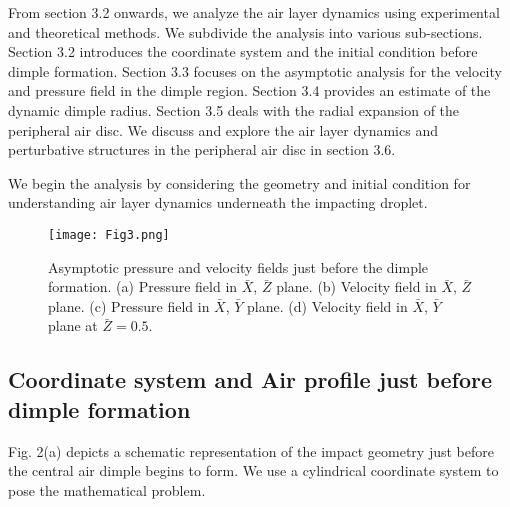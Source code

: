 \documentclass{jfm}
\begin{document}
 From section 3.2 onwards, we analyze the air layer dynamics using experimental and theoretical methods. We subdivide the analysis into various sub-sections. Section 3.2 introduces the coordinate system and the initial condition before dimple formation. Section 3.3 focuses on the asymptotic analysis for the velocity and pressure field in the dimple region. Section 3.4 provides an estimate of the dynamic dimple radius. Section 3.5 deals with the radial expansion of the peripheral air disc. We discuss and explore the air layer dynamics and perturbative structures in the peripheral air disc in section 3.6.

We begin the analysis by considering the geometry and initial condition for understanding air layer dynamics underneath the impacting droplet. 
\begin{figure*}
    \centering
    \texttt{[image: Fig3.png]}
    \caption{Asymptotic pressure and velocity fields just before the dimple formation. (a) Pressure field in $\bar{X}$, $\bar{Z}$ plane. (b) Velocity field in $\bar{X}$, $\bar{Z}$ plane. (c) Pressure field in $\bar{X}$, $\bar{Y}$ plane. (d) Velocity field in $\bar{X}$, $\bar{Y}$ plane at $\bar{Z}=0.5$.}
    \label{Figure3}
\end{figure*}

\subsection{Coordinate system and Air profile just before dimple formation}
Fig. 2(a) depicts a schematic representation of the impact geometry just before the central air dimple begins to form. We use a cylindrical coordinate system to pose the mathematical problem.
\end{document}
